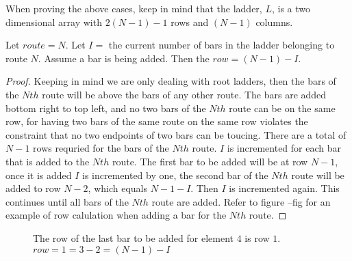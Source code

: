 When proving the above cases, keep in mind that the ladder, $L$, is a two dimensional array with $2(N-1)-1$ rows and $(N-1)$ columns.

\begin{lemma}
  Let $route=N$. Let $I=$ the current number of bars in the ladder belonging to route $N$. 
  Assume a bar is being added. Then the $row=(N-1)-I$.
\end{lemma}
\begin{proof}
  Keeping in mind we are only dealing with root ladders, then the bars of the $Nth$ route will be above the bars of 
  any other route. The bars are added bottom right to top left, and no two bars of the $Nth$ route can be on the same row, 
  for having two bars of the same route on the same row violates the constraint that no two endpoints of two bars can be toucing.
  There are a total of $N-1$ rows requried for the bars of the $Nth$ route. $I$ is incremented for each bar that is added 
  to the $Nth$ route. The first bar to be added will be at row $N-1$, once it is added $I$ is incremented by one, the second 
  bar of the $Nth$ route will be added to row $N-2$, which equals $N-1-I$. Then $I$ is incremented again. This continues 
  until all bars of the $Nth$ route are added. Refer to figure --fig for an example of row calulation when adding a bar 
  for the $Nth$ route.
\end{proof}\pagebreak


\begin{figure}[!htp]
  \begin{center}
  \end{center}
  \caption{The row of the last bar to be added for element $4$ is row $1$. $row=1=3-2=(N-1)-I$}
\end{figure}

